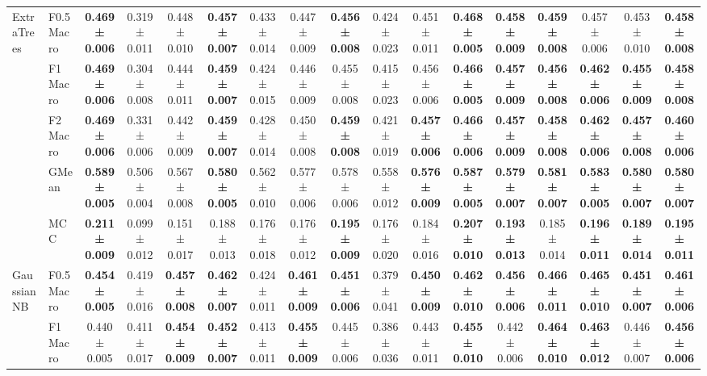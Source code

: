 \begin{table}[H]
{\begin{tabular}{llccccccccccccccc}
\cline{1-17}
\multirow[t]{5}{*}{ExtraTrees} & F0.5 Macro & \textbf{0.469 ± 0.006} & 0.319 ± 0.011 & 0.448 ± 0.010 & \textbf{0.457 ± 0.007} & 0.433 ± 0.014 & 0.447 ± 0.009 & \textbf{0.456 ± 0.008} & 0.424 ± 0.023 & 0.451 ± 0.011 & \textbf{0.468 ± 0.005} & \textbf{0.458 ± 0.009} & \textbf{0.459 ± 0.008} & 0.457 ± 0.006 & 0.453 ± 0.010 & \textbf{0.458 ± 0.008} \\
 & F1 Macro & \textbf{0.469 ± 0.006} & 0.304 ± 0.008 & 0.444 ± 0.011 & \textbf{0.459 ± 0.007} & 0.424 ± 0.015 & 0.446 ± 0.009 & 0.455 ± 0.008 & 0.415 ± 0.023 & 0.456 ± 0.006 & \textbf{0.466 ± 0.005} & \textbf{0.457 ± 0.009} & \textbf{0.456 ± 0.008} & \textbf{0.462 ± 0.006} & \textbf{0.455 ± 0.009} & \textbf{0.458 ± 0.008} \\
 & F2 Macro & \textbf{0.469 ± 0.006} & 0.331 ± 0.006 & 0.442 ± 0.009 & \textbf{0.459 ± 0.007} & 0.428 ± 0.014 & 0.450 ± 0.008 & \textbf{0.459 ± 0.008} & 0.421 ± 0.019 & \textbf{0.457 ± 0.006} & \textbf{0.466 ± 0.006} & \textbf{0.457 ± 0.009} & \textbf{0.458 ± 0.008} & \textbf{0.462 ± 0.006} & \textbf{0.457 ± 0.008} & \textbf{0.460 ± 0.006} \\
 & GMean & \textbf{0.589 ± 0.005} & 0.506 ± 0.004 & 0.567 ± 0.008 & \textbf{0.580 ± 0.005} & 0.562 ± 0.010 & 0.577 ± 0.006 & 0.578 ± 0.006 & 0.558 ± 0.012 & \textbf{0.576 ± 0.009} & \textbf{0.587 ± 0.005} & \textbf{0.579 ± 0.007} & \textbf{0.581 ± 0.007} & \textbf{0.583 ± 0.005} & \textbf{0.580 ± 0.007} & \textbf{0.580 ± 0.007} \\
 & MCC & \textbf{0.211 ± 0.009} & 0.099 ± 0.012 & 0.151 ± 0.017 & 0.188 ± 0.013 & 0.176 ± 0.018 & 0.176 ± 0.012 & \textbf{0.195 ± 0.009} & 0.176 ± 0.020 & 0.184 ± 0.016 & \textbf{0.207 ± 0.010} & \textbf{0.193 ± 0.013} & 0.185 ± 0.014 & \textbf{0.196 ± 0.011} & \textbf{0.189 ± 0.014} & \textbf{0.195 ± 0.011} \\
\cline{1-17}
\multirow[t]{5}{*}{GaussianNB} & F0.5 Macro & \textbf{0.454 ± 0.005} & 0.419 ± 0.016 & \textbf{0.457 ± 0.008} & \textbf{0.462 ± 0.007} & 0.424 ± 0.011 & \textbf{0.461 ± 0.009} & \textbf{0.451 ± 0.006} & 0.379 ± 0.041 & \textbf{0.450 ± 0.009} & \textbf{0.462 ± 0.010} & \textbf{0.456 ± 0.006} & \textbf{0.466 ± 0.011} & \textbf{0.465 ± 0.010} & \textbf{0.451 ± 0.007} & \textbf{0.461 ± 0.006} \\
 & F1 Macro & 0.440 ± 0.005 & 0.411 ± 0.017 & \textbf{0.454 ± 0.009} & \textbf{0.452 ± 0.007} & 0.413 ± 0.011 & \textbf{0.455 ± 0.009} & 0.445 ± 0.006 & 0.386 ± 0.036 & 0.443 ± 0.011 & \textbf{0.455 ± 0.010} & 0.442 ± 0.006 & \textbf{0.464 ± 0.010} & \textbf{0.463 ± 0.012} & 0.446 ± 0.007 & \textbf{0.456 ± 0.006} \\

\end{tabular}}
\end{table}
